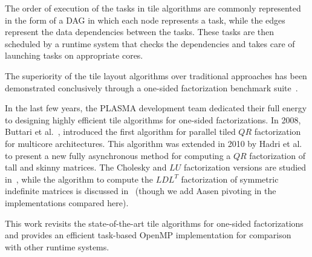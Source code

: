 The order of execution of the tasks in tile algorithms are commonly
represented in the form of a DAG in which each node represents a task, while
the edges represent the data dependencies between the tasks.  These
tasks are then scheduled by a runtime system that checks the
dependencies and takes care of launching tasks on appropriate cores.

The superiority of the tile layout algorithms over traditional
approaches has been demonstrated conclusively through a one-sided
factorization benchmark suite~\cite{agullo2009comparative}.

In the last few years,
the PLASMA development team dedicated their full
energy to designing highly efficient tile
algorithms for one-sided factorizations.
In 2008, Buttari et al.~\cite{buttari2008parallel},
introduced the first algorithm for parallel tiled $QR$ factorization for
multicore architectures.
This algorithm was extended in 2010 by
Hadri et al.~\cite{hadri2010tile} to present a new fully asynchronous
method for computing a $QR$ factorization of tall and skinny matrices.
The Cholesky and $LU$ factorization versions are studied
in~\cite{DBLP:journals/corr/abs-0709-1272}, while the algorithm to
compute the $LDL^T$ factorization of symmetric indefinite matrices is
discussed in~\cite{becker2011towards}
(though we add Aasen pivoting in the implementations compared here).

This work revisits the state-of-the-art tile algorithms for
one-sided factorizations and provides an
efficient task-based OpenMP implementation for comparison with
other runtime systems.
